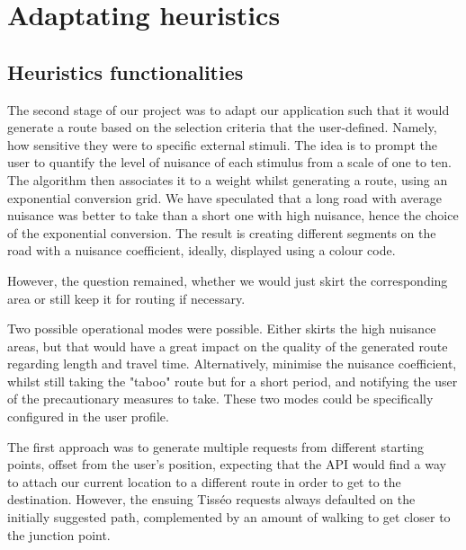\section{Adaptating heuristics}
\subsection{Heuristics functionalities}

The second stage of our project was to adapt our application such that it would generate a route based on the selection criteria that the user-defined. Namely, how sensitive they were to specific external stimuli. The idea is to prompt the user to quantify the level of nuisance of each stimulus from a scale of one to ten. The algorithm then associates it to a weight whilst generating a route, using an exponential conversion grid. We have speculated that a long road with average nuisance was better to take than a short one with high nuisance, hence the choice of the exponential conversion. The result is creating different segments on the road with a nuisance coefficient, ideally, displayed using a colour code. 
\newline

However, the question remained, whether we would just skirt the corresponding area or still keep it for routing if necessary.
\newline

Two possible operational modes were possible. Either skirts the high nuisance areas, but that would have a great impact on the quality of the generated route regarding length and travel time. Alternatively, minimise the nuisance coefficient, whilst still taking the "taboo" route but for a short period, and notifying the user of the precautionary measures to take. These two modes could be specifically configured in the user profile. 
\newline

The first approach was to generate multiple requests from different starting points, offset from the user's position, expecting that the API would find a way to attach our current location to a different route in order to get to the destination. However, the ensuing Tisséo requests always defaulted on the initially suggested path, complemented by an amount of walking to get closer to the junction point.
\newline

